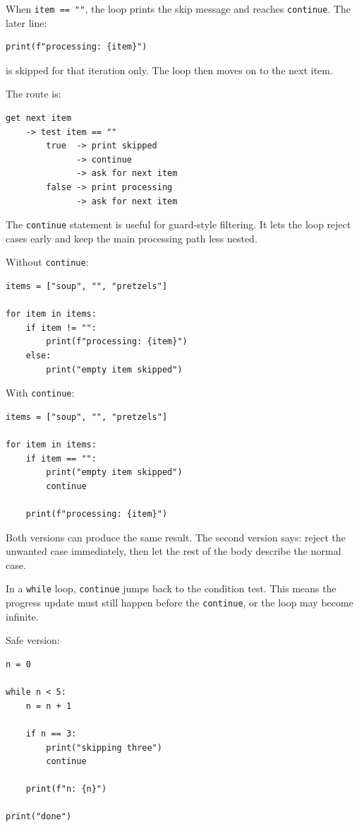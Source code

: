 When \texttt{item == ""}, the loop prints the skip message and reaches \texttt{continue}. The later line:

\begin{verbatim}
print(f"processing: {item}")
\end{verbatim}

is skipped for that iteration only. The loop then moves on to the next item.

The route is:

\begin{verbatim}
get next item
    -> test item == ""
        true  -> print skipped
              -> continue
              -> ask for next item
        false -> print processing
              -> ask for next item
\end{verbatim}

The \texttt{continue} statement is useful for guard-style filtering. It lets the loop reject cases early and keep the main processing path less nested.

Without \texttt{continue}:

\begin{verbatim}
items = ["soup", "", "pretzels"]

for item in items:
    if item != "":
        print(f"processing: {item}")
    else:
        print("empty item skipped")
\end{verbatim}

With \texttt{continue}:

\begin{verbatim}
items = ["soup", "", "pretzels"]

for item in items:
    if item == "":
        print("empty item skipped")
        continue

    print(f"processing: {item}")
\end{verbatim}

Both versions can produce the same result. The second version says: reject the unwanted case immediately, then let the rest of the body describe the normal case.

In a \texttt{while} loop, \texttt{continue} jumps back to the condition test. This means the progress update must still happen before the \texttt{continue}, or the loop may become infinite.

Safe version:

\begin{verbatim}
n = 0

while n < 5:
    n = n + 1

    if n == 3:
        print("skipping three")
        continue

    print(f"n: {n}")

print("done")
\end{verbatim}

